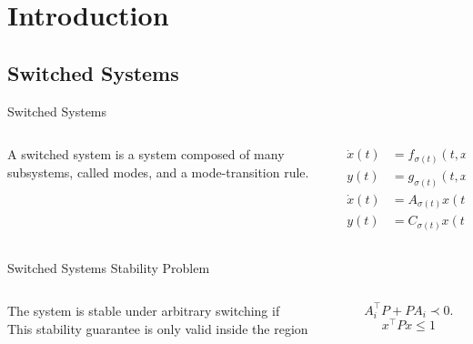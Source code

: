 
\section{Introduction}%
\label{sec:introduction}

\subsection{Switched Systems}%
\label{subsec:switched-systems}

\begin{slide}{Switched Systems}
  \begin{columns}[c]
    \begin{column}{0.48\textwidth}
      A switched system is a system composed of many subsystems, called modes,
      and a mode-transition rule.
    \end{column}%
    \hfill%
    \begin{column}{0.48\textwidth}
      \begin{equation}
        \begin{aligned}
          \dot{x}(t) & = f_{\sigma(t)}(t,x(t),u(t)), \\
          y(t)       & = g_{\sigma(t)}(t,x(t)),
        \end{aligned}
      \end{equation}
      \vspace*{1cm}
      \begin{equation}
        \begin{aligned}
          \dot{x}(t) & = A_{\sigma(t)}x(t) + B_{\sigma(t)}u(t), \\
          y(t)       & = C_{\sigma(t)}x(t) + D_{\sigma(t)}u(t).
        \end{aligned}
      \end{equation}
    \end{column}%
  \end{columns}
\end{slide}

\begin{slide}{Switched Systems Stability Problem}
  \begin{columns}[c]
    \begin{column}{0.48\textwidth}
      The system is stable under arbitrary switching if\\
      \vspace*{1cm}
      This stability guarantee is only valid inside the region
    \end{column}%
    \hfill%
    \begin{column}{0.48\textwidth}
      \begin{equation}
        A_{i}^{\top}P+PA_{i} \prec{} 0.
      \end{equation}
      \vspace*{1cm}
      \begin{equation}
        x^{\top}Px \leq 1
      \end{equation}
    \end{column}%
  \end{columns}
\end{slide}


